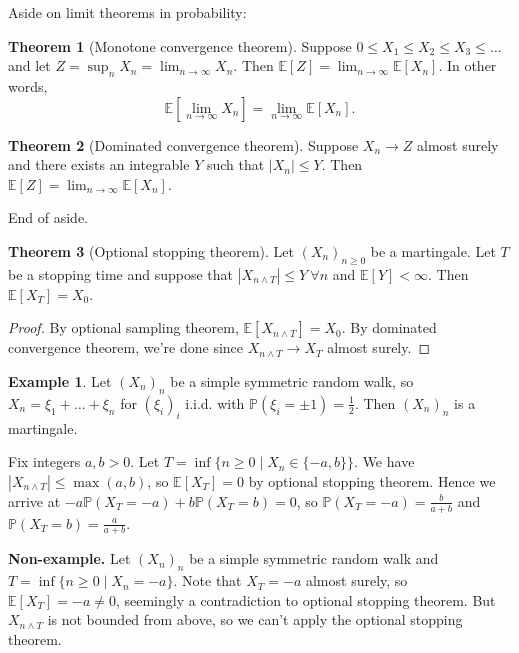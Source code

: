 \documentclass{article}
\theoremstyle{definition}
\newtheorem{theorem}{Theorem}[section]
\newtheorem{example}{Example}[section]
\begin{document}
Aside on limit theorems in probability:
\begin{theorem}[Monotone convergence theorem]
    Suppose $0\le X_1\le X_2\le X_3\le \ldots$ and let $Z=\sup_n X_n = \lim_{n \to \infty} X_n$. Then $\mathbb{E}[Z]=\lim_{n \to \infty} \mathbb{E}[X_n]$. In other words,
    \[
    \mathbb{E}[\lim_{n \to \infty}X_n] = \lim_{n \to \infty}\mathbb{E}[X_n].
    \]
\end{theorem}
\begin{theorem}[Dominated convergence theorem]
    Suppose $X_n \to Z$ almost surely and there exists an integrable $Y$ such that $|X_n|\le Y$. Then $\mathbb{E}[Z]=\lim_{n \to \infty}\mathbb{E}[X_n]$.
\end{theorem}
End of aside.
\begin{theorem}[Optional stopping theorem]
    Let $(X_n)_{n\ge 0}$ be a martingale. Let $T$ be a stopping time and suppose that $|X_{n \wedge T}|\le Y ~\forall n$ and $\mathbb{E}[Y]<\infty$. Then $\mathbb{E}[X_T]=X_0$.
\end{theorem}
\begin{proof}
    By optional sampling theorem, $\mathbb{E}[X_{n \wedge T}] = X_0$. By dominated convergence theorem, we're done since $X_{n \wedge T} \to X_T$ almost surely.
\end{proof}

\begin{example}
    Let $(X_n)_n$ be a simple symmetric random walk, so $X_n = \xi_1+\ldots+\xi_n$ for $(\xi_i)_i$ i.i.d. with $\mathbb{P}(\xi_i= \pm 1)=\frac{1}{2}$. Then $(X_n)_n$ is a martingale. 
    \vspace{1mm}
    
    Fix integers $a,b>0$. Let $T = \inf \{n\ge 0 \mid X_n \in \{-a,b\}\}$. We have $|X_{n \wedge T}|\le \max(a,b)$, so $\mathbb{E}[X_T]=0$ by optional stopping theorem. Hence we arrive at $-a \mathbb{P}(X_T=-a)+b\mathbb{P}(X_T=b)=0$, so $\mathbb{P}(X_T=-a)=\frac{b}{a+b}$ and $\mathbb{P}(X_T=b)=\frac{a}{a+b}$.
\end{example}

\textbf{Non-example.} Let $(X_n)_n$ be a simple symmetric random walk and $T= \inf \{n\ge 0 \mid X_n=-a\}$. Note that $X_T=-a$ almost surely, so $\mathbb{E}[X_T]=-a \neq 0$, seemingly a contradiction to optional stopping theorem. But $X_{n \wedge T}$ is not bounded from above, so we can't apply the optional stopping theorem.

\end{document}

